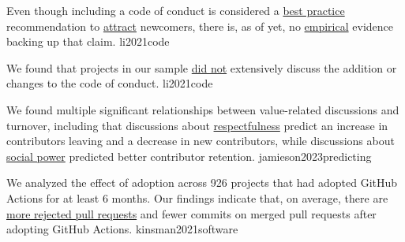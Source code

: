 \documentclass{article}
\begin{document}

  {Even though including a code of conduct is considered a \ul{best practice} recommendation to \ul{attract} newcomers, there is, as of yet, no \ul{empirical} evidence backing up that claim.}
  {li2021code}

  {We found that projects in our sample \ul{did not} extensively discuss the addition or changes to the code of conduct.}
  {li2021code}

  {We found multiple significant relationships between value-related discussions and turnover, including that discussions about \ul{respectfulness} predict an increase in contributors leaving and a decrease in new contributors, while discussions about \ul{social power} predicted better contributor retention.}
  {jamieson2023predicting}


  {We analyzed the effect of adoption across 926 projects that had adopted GitHub Actions for at least 6 months. Our findings indicate that, on average, there are \ul{more rejected pull requests} and fewer commits on merged pull requests after adopting GitHub Actions.}
  {kinsman2021software}
\end{document}
